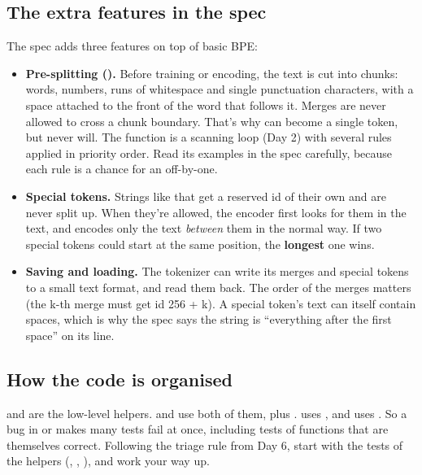 \documentclass[10pt,a4paper]{article}
\begin{document}
\subsection{The extra features in the spec}
The spec adds three features on top of basic BPE:
\begin{itemize}
\item \textbf{Pre-splitting ().} Before training or encoding, the text is cut into chunks: words, numbers, runs of whitespace and single punctuation characters, with a space attached to the front of the word that follows it. Merges are never allowed to cross a chunk boundary. That’s why  can become a single token, but  never will. The function is a scanning loop (Day 2) with several rules applied in priority order. Read its examples in the spec carefully, because each rule is a chance for an off-by-one.
\item \textbf{Special tokens.} Strings like  that get a reserved id of their own and are never split up. When they’re allowed, the encoder first looks for them in the text, and encodes only the text \emph{between} them in the normal way. If two special tokens could start at the same position, the \textbf{longest} one wins.
\item \textbf{Saving and loading.} The tokenizer can write its merges and special tokens to a small text format, and read them back. The order of the merges matters (the k-th merge must get id 256 + k). A special token’s text can itself contain spaces, which is why the spec says the string is “everything after the first space” on its line.
\end{itemize}
\subsection{How the code is organised}
 and  are the low-level helpers.  and  use both of them, plus .  uses , and  uses . So a bug in  or  makes many tests fail at once, including tests of functions that are themselves correct. Following the triage rule from Day 6, start with the tests of the helpers (, , ), and work your way up.
\end{document}

